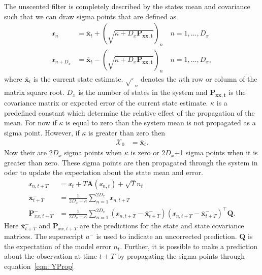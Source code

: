The unscented filter is completely described by the states mean and covariance such that we can draw sigma points that are defined as  \begin{align}
\label{eqn: Unscented_Transform1}
\mathbf{\mathcal{x}}_{n} &= \mathbf{\overline{x}}_{t} + (\sqrt{\kappa+D_{x}\mathbf{P_{xx,t}}})_{n} \quad n=1,\hdots,D_x\\
\label{eqn: Unscented_Transform2}
\mathbf{\mathcal{x}}_{n+D_{x}} &= \mathbf{\overline{x}}_{t} - (\sqrt{\kappa+D_{x}\mathbf{P_{xx,t}}})_{n} \quad n=1,\hdots,D_x,
\end{align} where $\mathbf{\overline{x}}_{t}$ is the current state estimate. $\sqrt{\cdot}_{n}$ denotes the $n$th row or column of the matrix square root. $D_{x}$ is the number of states in the system and $\mathbf{P_{xx,t}}$ is the covariance matrix or expected error of the current state estimate. $\kappa$ is a predefined constant which determine the relative effect of the propagation of the mean. For now if $\kappa$ is equal to zero than the system mean is not propagated as a sigma point. However, if $\kappa$ is greater than zero then \begin{align}
\mathbf{\mathcal{X}}_{0} &= \mathbf{\overline{x}}_{t}.
\end{align} Now their are 2$D_{x}$ sigma points when $\kappa$ is zero or 2$D_{x}$+1 sigma points when it is greater than zero. These sigma points are then propagated through the system in oder to update the expectation about the state mean and error. \begin{align}
\mathbf{\mathcal{x}}_{n,t+T} &= \mathbf{\mathcal{x}}_{t}+ T\mathbf{A}(\mathbf{\mathcal{x}}_{n,t}) +\sqrt{T}{n}_{t}\\
\overline{\mathbf{x}}_{t+T}^{-} &= \frac{1}{2D_{x}+\kappa}\sum_{n=1}^{2D_{x}} \mathbf{\mathcal{x}}_{n,t+T}\\
\mathbf{P}_{xx,t+T}^{-} &= \frac{1}{2D_{x}+\kappa}\sum_{n=1}^{2D_{x}} (\mathbf{\mathcal{x}}_{n,t+T} -\mathbf{\overline{x}}_{t+T}^{-})(\mathbf{\mathcal{x}}_{n,t+T}-\mathbf{\overline{x}}_{t+T}^{-})^{\top} \mathbf{Q}.
\end{align} Here $\overline{\mathbf{x}}_{t+T}^{-}$ and $\mathbf{P}_{xx,t+T}^{-}$ are the predictions for the state and state covariance matrices. The superscript $a^{-}$ is used to indicate an uncorrected prediction. $\mathbf{Q}$ is the expectation of the model error $n_{t}$. Further, it is possible to make a prediction about the observation at time $t+T$ by propagating the sigma points through equation~\ref{eqn: YProp} \begin{align} 

\end{align}
